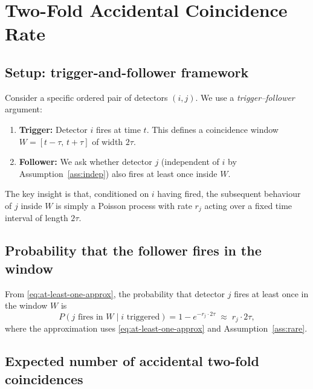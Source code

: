\documentclass[12pt]{article}
\theoremstyle{definition}
\newcommand{\Prob}[1]{P\!\left(#1\right)}
\begin{document}
\section{Two-Fold Accidental Coincidence Rate}
\label{sec:two-fold}

\subsection{Setup: trigger-and-follower framework}

Consider a specific ordered pair of detectors $(i, j)$.  We use a
\emph{trigger–follower} argument:

\begin{enumerate}
    \item \textbf{Trigger:} Detector $i$ fires at time $t$.  This
          defines a coincidence window $W = [t-\tau,\, t+\tau]$ of
          width $2\tau$.
    \item \textbf{Follower:} We ask whether detector $j$ (independent
          of $i$ by Assumption~\ref{ass:indep}) also fires at least
          once inside $W$.
\end{enumerate}

The key insight is that, conditioned on $i$ having fired, the subsequent
behaviour of $j$ inside $W$ is simply a Poisson process with rate $r_j$
acting over a fixed time interval of length $2\tau$.

\subsection{Probability that the follower fires in the window}

From \eqref{eq:at-least-one-approx}, the probability that detector $j$
fires at least once in the window $W$ is
\begin{equation}
    \Prob{j \text{ fires in } W \mid i \text{ triggered}}
    = 1 - e^{-r_j \cdot 2\tau}
    \;\approx\; r_j \cdot 2\tau,
    \label{eq:pj-in-window}
\end{equation}
where the approximation uses \eqref{eq:at-least-one-approx} and
Assumption~\ref{ass:rare}.

\subsection{Expected number of accidental two-fold coincidences}
\end{document}
